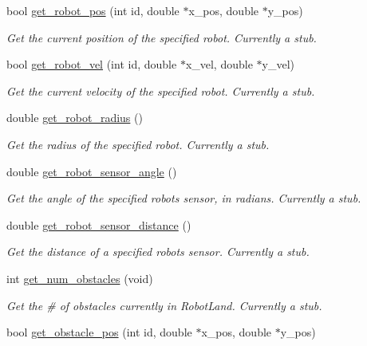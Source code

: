 \begin{DoxyCompactItemize}
\item 
bool \hyperlink{classrobot__land_a600cee26e615092e6425e5f1f8544d8b}{get\+\_\+robot\+\_\+pos} (int id, double $\ast$x\+\_\+pos, double $\ast$y\+\_\+pos)
\begin{DoxyCompactList}\small\item\em Get the current position of the specified robot. Currently a stub. \end{DoxyCompactList}\item 
bool \hyperlink{classrobot__land_a2c12e8cb4cea6ca18db18b30b205b6a8}{get\+\_\+robot\+\_\+vel} (int id, double $\ast$x\+\_\+vel, double $\ast$y\+\_\+vel)
\begin{DoxyCompactList}\small\item\em Get the current velocity of the specified robot. Currently a stub. \end{DoxyCompactList}\item 
double \hyperlink{classrobot__land_a874897fdbb0d4bf54cd70226d3515bdd}{get\+\_\+robot\+\_\+radius} ()
\begin{DoxyCompactList}\small\item\em Get the radius of the specified robot. Currently a stub. \end{DoxyCompactList}\item 
double \hyperlink{classrobot__land_a9f874d4ea9cb32801af60413753a39f7}{get\+\_\+robot\+\_\+sensor\+\_\+angle} ()
\begin{DoxyCompactList}\small\item\em Get the angle of the specified robots sensor, in radians. Currently a stub. \end{DoxyCompactList}\item 
double \hyperlink{classrobot__land_a4bef892a1b2c7c6a539dfed5fd2abae5}{get\+\_\+robot\+\_\+sensor\+\_\+distance} ()
\begin{DoxyCompactList}\small\item\em Get the distance of a specified robot\textquotesingle{}s sensor. Currently a stub. \end{DoxyCompactList}\item 
int \hyperlink{classrobot__land_ab6edf762a971b54341c1d0740c2c431d}{get\+\_\+num\+\_\+obstacles} (void)
\begin{DoxyCompactList}\small\item\em Get the \# of obstacles currently in Robot\+Land. Currently a stub. \end{DoxyCompactList}\item 
bool \hyperlink{classrobot__land_ab9f49e83909a16ecc0aeae8f6fa6f673}{get\+\_\+obstacle\+\_\+pos} (int id, double $\ast$x\+\_\+pos, double $\ast$y\+\_\+pos)

\end{DoxyCompactItemize}
